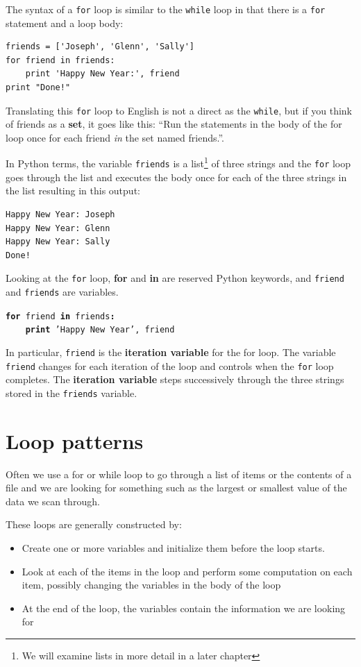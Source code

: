 \documentclass[10pt]{book}
\begin{document}
The syntax of a {\tt for} loop is similar to the {\tt while} loop
in that there is a {\tt for} statement and a loop body:

\beforeverb
\begin{verbatim}
friends = ['Joseph', 'Glenn', 'Sally']
for friend in friends:
    print 'Happy New Year:', friend
print "Done!"
\end{verbatim}
\afterverb
%
Translating this {\tt for} loop to English is not a direct as the 
{\tt while}, but if you think of friends as a {\bf set},
it goes like this: ``Run the statements in the body of the 
for loop once for each friend {\em in} the set named friends.''.

In Python terms, 
the variable {\tt friends} is a list\footnote{We will 
examine lists in more detail in a later chapter} 
of three strings and the {\tt for}
loop goes through the list and executes the body once
for each of the three strings in the list resulting in this output:

\beforeverb
\begin{verbatim}
Happy New Year: Joseph
Happy New Year: Glenn
Happy New Year: Sally
Done!
\end{verbatim}
\afterverb
%
Looking at the {\tt for} loop, {\bf for} and {\bf in} are reserved
Python keywords, and {\tt friend} and {\tt friends} are variables.

{\tt {\bf for} friend {\bf in} friends{\bf :}\\
\verb"    "{\bf print} 'Happy New Year', friend }

In particular, {\tt friend} is the {\bf iteration variable} for 
the for loop.  The variable {\tt friend} changes for each iteration of
the loop and controls when the {\tt for} loop completes.  The 
{\bf iteration variable} steps successively through the 
three strings stored in the {\tt friends} variable.


\section{Loop patterns}

Often we use a for or while loop to go through a list of items
or the contents of a file and we are looking for something such as
the largest or smallest value of the data we scan through.

These loops are generally constructed by:

\begin{itemize}

\item Create one or more variables and initialize them before the loop
starts.

\item Look at each of the items in the loop and perform some computation
on each item, possibly changing the variables in the body of the loop

\item At the end of the loop, the variables contain the information
we are looking for

\end{itemize}
\end{document}
